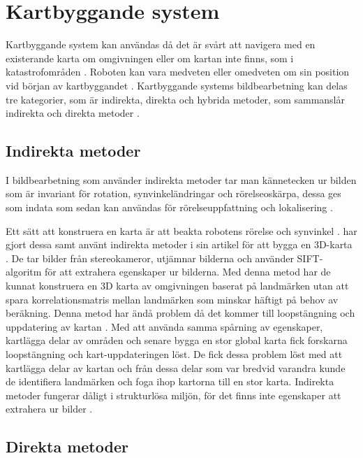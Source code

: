\section{Kartbyggande system}

Kartbyggande system kan användas då det är svårt att navigera med en existerande karta om omgivningen eller om kartan inte finns, som i katastrofområden \citep{geospatial}. Roboten kan vara medveten eller omedveten om sin position vid början av kartbyggandet \citep{globalsubmaps}. Kartbyggande systems bildbearbetning kan delas tre kategorier, som är indirekta, direkta och hybrida metoder, som sammanslår indirekta och direkta metoder \citep{geospatial}.

\subsection{Indirekta metoder}

I bildbearbetning som använder indirekta metoder tar man kännetecken ur bilden som är invariant för rotation, synvinkeländringar och rörelseoskärpa, dessa ges som indata som sedan kan användas för rörelseuppfattning och lokalisering \citep{geospatial}. 

Ett sätt att konstruera en karta är att beakta robotens rörelse och synvinkel \citep{globalsubmaps}. \cite{mapbuildingsift} har gjort dessa samt använt indirekta metoder i sin artikel  för att bygga en 3D-karta \citep{mapbuildingsift}. De tar bilder från stereokameror, utjämnar bilderna och använder SIFT-algoritm för att extrahera egenskaper ur bilderna. Med denna metod har de kunnat konstruera en 3D karta av omgivningen baserat på landmärken utan att spara korrelationsmatris mellan landmärken som minskar häftigt på behov av beräkning. Denna metod har ändå problem då det kommer till loopstängning och uppdatering av kartan \citep{globalsubmaps}. Med att använda samma spårning av egenskaper, kartlägga delar av områden och senare bygga en stor global karta fick forskarna loopstängning och kart-uppdateringen löst. De fick dessa problem löst med att kartlägga delar av kartan och från dessa delar som var bredvid varandra kunde de identifiera landmärken och foga ihop kartorna till en stor karta. Indirekta metoder fungerar dåligt i strukturlösa miljön, för det finns inte egenskaper att extrahera ur bilder \citep{geospatial}.

\subsection{Direkta metoder}

